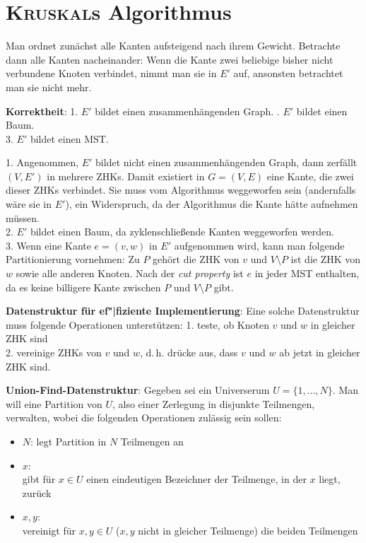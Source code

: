 \section{%
    \textsc{Kruskal}s Algorithmus%
}

Man ordnet zunächst alle Kanten aufsteigend nach ihrem Gewicht.
Betrachte dann alle Kanten nacheinander:
Wenn die Kante zwei beliebige bisher nicht verbundene Knoten verbindet,
nimmt man sie in $E'$ auf, ansonsten betrachtet man sie nicht mehr.

\linie

\textbf{Korrektheit}:
1. $E'$ bildet einen zusammenhängenden Graph. . $E'$ bildet einen Baum. \\
3. $E'$ bildet einen MST.

\begin{Beweis}
    1. Angenommen, $E'$ bildet nicht einen zusammenhängenden Graph,
    dann zerfällt $(V, E')$ in mehrere ZHKs.
    Damit existiert in $G = (V, E)$ eine Kante, die zwei dieser ZHKs verbindet.
    Sie muss vom Algorithmus weggeworfen sein (andernfalls wäre sie in $E'$),
    ein Widerspruch, da der Algorithmus die Kante hätte aufnehmen müssen. \\
    2. $E'$ bildet einen Baum, da zyklenschließende Kanten weggeworfen
    werden. \\
    3. Wenn eine Kante $e = (v, w)$ in $E'$ aufgenommen wird, kann man folgende
    Partitionierung vornehmen:
    Zu $P$ gehört die ZHK von $v$ und $V \setminus P$ ist die ZHK von $w$
    sowie alle anderen Knoten.
    Nach der \emph{cut property} ist $e$ in jeder MST enthalten, da es keine
    billigere Kante zwischen $P$ und $V \setminus P$ gibt.
\end{Beweis}

\linie

\textbf{Datenstruktur für ef"|fiziente Implementierung}:
Eine solche Datenstruktur muss folgende Operationen unterstützen:
1. teste, ob Knoten $v$ und $w$ in gleicher ZHK sind \\
2. vereinige ZHKs von $v$ und $w$,
d.\,h. drücke aus, dass $v$ und $w$ ab jetzt in gleicher ZHK sind.

\textbf{Union-Find-Datenstruktur}:
Gegeben sei ein Universerum $U = \{1, \dotsc, N\}$.
Man will eine Partition von $U$, also einer Zerlegung in disjunkte Teilmengen,
verwalten, wobei die folgenden Operationen zulässig sein sollen:
\begin{itemize}
    \item
    \textbf{$N$\code{)}}:
    legt Partition in $N$ Teilmengen an

    \item
    \textbf{$x$\code{)}}: \\
    gibt für $x \in U$ einen eindeutigen Bezeichner der Teilmenge, in der
    $x$ liegt, zurück

    \item
    \textbf{$x, y$\code{)}}: \\
    vereinigt für $x, y \in U$ ($x, y$ nicht in gleicher Teilmenge)
    die beiden Teilmengen
\end{itemize}

